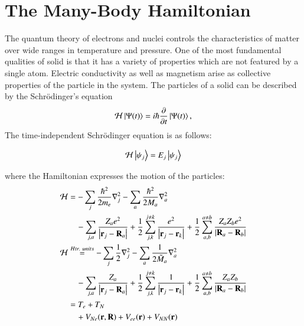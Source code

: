 \section{The Many-Body Hamiltonian}
The quantum theory of electrons and nuclei controls the characteristics of matter over wide ranges in temperature and pressure. One of the most fundamental qualities of solid is that it has a variety of properties which are not featured by a single atom. Electric conductivity as well as magnetism arise as collective properties of the particle in the system. The particles of a solid can be described by the Schr\"odinger's equation
\begin{equation}
	\mathcal{H}\ket{\Psi(t)} = i\hbar  \frac{\partial}{\partial t}\ket{\Psi(t)},
\end{equation}
The time-independent Schr\"odinger equation is as follows:


\begin{equation}\label{sheqn}
	\mathcal{H}\ket{\psi_j} = E_j\ket{\psi_j}
\end{equation}

where the Hamiltonian expresses the motion of the particles:
\begin{align}\label{hameqn}
 \mathcal{H} &= -\sum_j \frac{\hbar^2}{2m_e}\nabla^2_j - \sum_a \frac{\hbar^2}{2M_a}\nabla^2_a \nonumber \\
			& \quad -\sum_{j,a}\frac{Z_ae^2}{\abs{\vb{r}_j-\vb{R}_a}} + \frac{1}{2}\sum_{j,k}^{j\neq k} \frac{e^2}{\abs{\vb{r}_j - \vb{r}_k}} + \frac{1}{2}\sum_{a,b}^{a\neq b} \frac{Z_aZ_be^2}{\abs{\vb{R}_a - \vb{R}_b}} \nonumber \\
 \mathcal{H} & \stackrel{Htr.\ units}{=} -\sum_j\frac{1}{2}\nabla^2_j - \sum_a\frac{1}{2\tilde{M}_a}\nabla_a^2 \nonumber \\
			& \quad -\sum_{j,a}\frac{Z_a}{\abs{\vb{r}_j - \vb{R}_a}} + \frac{1}{2}\sum_{j,k}^{j\neq k} \frac{1}{\abs{\vb{r}_j-\vb{r}_k}} + \frac{1}{2}\sum_{a,b}^{a\neq b} \frac{Z_aZ_b}{\abs{\vb{R}_a - \vb{R}_b}} \nonumber \\
   & = T_e + T_N \nonumber \\
   & \quad + V_{Ne}(\vb{r},\vb{R}) + V_{ee}(\vb{r}) + V_{NN}(\vb{r}) 
\end{align}

